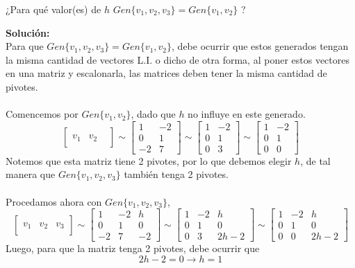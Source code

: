 \documentclass[12pt]{article}
\newenvironment{solucion}
{\begin{mdframed}[backgroundcolor=black!10]
		{\bf Solución:}\\
	}
	{
	\end{mdframed}
}
\newenvironment{preguntas}
{\begin{enumerate}\itemsep12pt
	}
	{
	\end{enumerate}
}
\newcommand{\ra}{\rightarrow}
\begin{document}
\begin{preguntas}
¿Para qué valor(es) de $h$ $Gen\{v_1, v_2, v_3\}=Gen\{v_1,v_2\}$ ?
\begin{solucion}
Para que $Gen\{v_1, v_2, v_3\}=Gen\{v_1,v_2\}$, debe ocurrir que estos generados tengan la misma cantidad de vectores L.I. o dicho de otra forma, al poner estos vectores en una matriz y escalonarla, las matrices deben tener la misma cantidad de pivotes.\\
	\\
	Comencemos por $Gen\{v_1,v_2\}$, dado que $h$ no influye en este generado.
	$$\begin{bmatrix}
	\\
	v_1 & v_2\\
	&&
	\end{bmatrix} \sim 
	\begin{bmatrix}
	1 & -2\\
	0 & 1\\
	-2 & 7
	\end{bmatrix} \sim 
	\begin{bmatrix}
	1 & -2\\
	0 & 1\\
	0 & 3
	\end{bmatrix} \sim 
	\begin{bmatrix}
	1 & -2\\
	0 & 1\\
	0 & 0
	\end{bmatrix}$$
	Notemos que esta matriz tiene 2 pivotes, por lo que debemos elegir $h$, de tal manera que $Gen\{v_1, v_2, v_3\}$ también tenga 2 pivotes.\\
	\\
	Procedamos ahora con $Gen\{v_1, v_2, v_3\}$,
	$$\begin{bmatrix}
	\\
	v_1 & v_2 & v_3\\
	&&
	\end{bmatrix} \sim 
	\begin{bmatrix}
	1 & -2 & h\\
	0 & 1 & 0\\
	-2 & 7 & -2
	\end{bmatrix} \sim 
	\begin{bmatrix}
	1 & -2 & h\\
	0 & 1 & 0\\
	0 & 3 & 2h-2
	\end{bmatrix} \sim 
	\begin{bmatrix}
	1 & -2 & h\\
	0 & 1 & 0\\
	0 & 0 & 2h-2
	\end{bmatrix}$$
	Luego, para que la matriz tenga 2 pivotes, debe ocurrir que
	$$2h-2 = 0 \ra h = 1$$
\end{solucion}
\end{preguntas}
\end{document}
